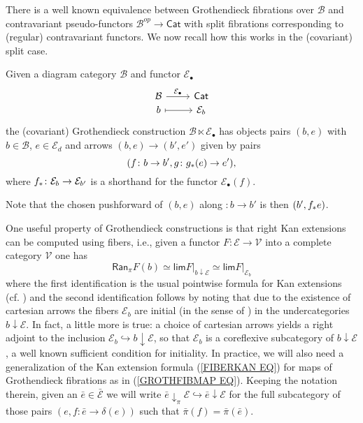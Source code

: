 \documentclass[a4paper,10pt]{article}%
\begin{document}
There is a well known equivalence between Grothendieck fibrations over $\mathcal{B}$ and contravariant pseudo-functors
$\mathcal{B}^{op} \to \mathsf{Cat}$
with split fibrations corresponding to (regular) contravariant functors. We now recall how this works in the (covariant) split case.

\begin{definition}\label{GROTHCONS DEF}
Given a diagram category $\mathcal{B}$ and functor $\mathcal{E}_{\bullet}$
\begin{equation}
\begin{tikzcd}[row sep = 0em]
	\mathcal{B} \ar{r}{\mathcal{E}_{\bullet}} & \mathsf{Cat} \\
	b \ar[mapsto]{r} & \mathcal{E}_b
\end{tikzcd}
\end{equation}
the (covariant) Grothendieck construction 
$\mathcal{B} \ltimes \mathcal{E}_{\bullet}$
has objects pairs $(b,e)$ with $b \in \mathcal{B}$,
$e \in \mathcal{E}_d$ and 
arrows $(b,e) \to (b',e')$ given by pairs
\[(f\colon b \to b', g \colon g_{\**}(e) \to e'),\]
where $f_{\**}\colon \mathcal{E}_b \to \mathcal{E}_{b'}$ is a shorthand for the functor $\mathcal{E}_{\bullet}(f)$.

Note that the chosen pushforward of $(b,e)$ along 
$\colon b \to b'$ is then $(b',f_{\**} e)$.
\end{definition}


One useful property of Grothendieck constructions is that
right Kan extensions can be computed using fibers, i.e., 
given a functor $F \colon \mathcal{E} \to \mathcal{V}$ into a complete category $\mathcal{V}$ one has
\begin{equation}\label{FIBERKAN EQ}
	\mathsf{Ran}_{\pi}F (b)
\simeq
	\mathsf{lim} F{|_{b \downarrow \mathcal{E}}}
\simeq
	\mathsf{lim} F|_{\mathcal{E}_b}
\end{equation}
where the first identification is the usual pointwise formula for Kan extensions (cf. \cite[X.3.1]{McL})
and the second identification follows by noting that due to the existence of cartesian arrows the fibers
$\mathcal{E}_b$ are initial (in the sense of \cite[IX.3]{McL})
in the undercategories $b \downarrow \mathcal{E}$.
In fact, a little more is true: a choice of cartesian arrows 
yields a right adjoint to the inclusion
$\mathcal{E}_b \hookrightarrow b \downarrow \mathcal{E}$, so that $\mathcal{E}_b$ is a coreflexive subcategory of 
$b \downarrow \mathcal{E}$,
a well known sufficient condition for initiality.
In practice, we will also need a generalization of the Kan extension formula (\ref{FIBERKAN EQ}) for maps of Grothendieck fibrations as in (\ref{GROTHFIBMAP EQ}).
Keeping the notation therein, given an $\bar{e} \in \bar{\mathcal{E}}$ we will write 
$\bar{e} \downarrow_{\pi} \mathcal{E} \hookrightarrow
\bar{e} \downarrow \mathcal{E}$
for the full subcategory of those pairs 
$\left(e,f \colon \bar{e} \to \delta(e)\right)$
such that $\bar{\pi}(f) = \bar{\pi}(\bar{e})$.
\end{document}

